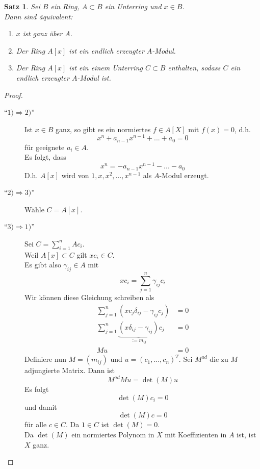 \documentclass[10pt,a4paper]{article}
\theoremstyle{plain}
\newtheorem{satz}[theorem]{Satz}
\theoremstyle{definition}
\theoremstyle{remark}
\begin{document}
	\begin{satz}
		Sei $B$ ein Ring, $A\subset B$ ein Unterring und $x\in B$.\\
		Dann sind äquivalent:
		\begin{enumerate}
			\item $x$ ist ganz über $A$.
			\item Der Ring $A[x]$ ist ein endlich erzeugter $A$-Modul.
			\item Der Ring $A[x]$ ist ein einem Unterring $C\subset B$ enthalten, sodass $C$ ein endlich erzeugter $A$-Modul ist.
		\end{enumerate}
	\end{satz}
	\begin{proof}
		\begin{description}
			\item[\enquote{$1)\Rightarrow2)$}] Ist $x\in B$ ganz, so gibt es ein normiertes $f\in A[X]$ mit $f(x)=0$, d.h.
			\[x^n+a_{n-1}x^{n-1}+...+a_0=0\]
			für geeignete $a_i\in A$.\\
			Es folgt, dass
			\[x^n=-a_{n-1}x^{n-1}-...-a_0\]
			D.h. $A[x]$ wird von $1,x,x^2,...,x^{n-1}$ als $A$-Modul erzeugt.
			\item[\enquote{$2)\Rightarrow3)$}]Wähle $C=A[x]$.
			\item[\enquote{$3)\Rightarrow1)$}] Sei $C=\sum_{i=1}^{n}Ac_i$.\\
			Weil $A[x]\subset C$ gilt $xc_i\in C$.\\
			Es gibt also $\gamma_{ij}\in A$ mit
			\[xc_{i}=\sum_{j=1}^{n}\gamma_{ij}c_i\]
			Wir können diese Gleichung schreiben als
			\begin{align*}
			\sum_{j=1}^{n}(xc_j\delta_{ij}-\gamma_{ij}c_j)&=0\\
			\sum_{j=1}^{n}\underbrace{(x\delta_{ij}-\gamma_{ij})}_{:=m_{ij}}c_j&=0\\
			Mu&=0
			\end{align*}
			Definiere nun $M=(m_{ij})$ und $u=(c_1,...,c_n)^T$.  Sei $M^{ad}$ die zu $M$ adjungierte Matrix. Dann ist
			\[M^{ad}Mu=\det(M)u\]
			Es folgt
			\[\det(M)c_i=0\]
			und damit
			\[\det(M)c=0\]
			für alle $c\in C$. Da $1\in C$ ist $\det(M)=0$.\\
			Da $\det(M)$ ein normiertes Polynom in $X$ mit Koeffizienten in $A$ ist, ist $X$ ganz.
		\end{description}
	\end{proof}
\end{document}

